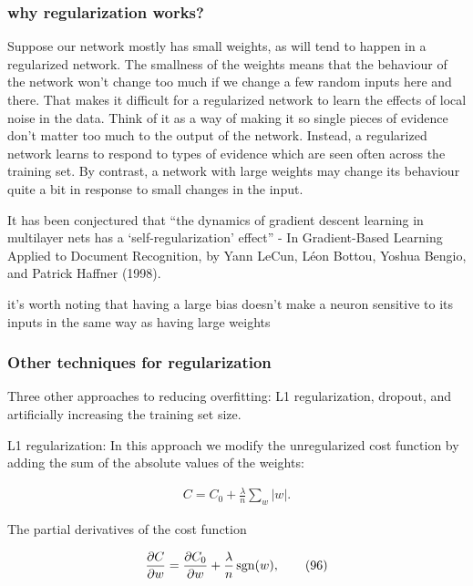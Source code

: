 \documentclass[]{book}
\begin{document}
\subsubsection{why regularization
works?}\label{why-regularization-works}

Suppose our network mostly has small weights, as will tend to happen in
a regularized network. The smallness of the weights means that the
behaviour of the network won't change too much if we change a few random
inputs here and there. That makes it difficult for a regularized network
to learn the effects of local noise in the data. Think of it as a way of
making it so single pieces of evidence don't matter too much to the
output of the network. Instead, a regularized network learns to respond
to types of evidence which are seen often across the training set. By
contrast, a network with large weights may change its behaviour quite a
bit in response to small changes in the input.

It has been conjectured that ``the dynamics of gradient descent learning
in multilayer nets has a `self-regularization' effect'' - In
Gradient-Based Learning Applied to Document Recognition, by Yann LeCun,
Léon Bottou, Yoshua Bengio, and Patrick Haffner (1998).

it's worth noting that having a large bias doesn't make a neuron
sensitive to its inputs in the same way as having large weights

\subsubsection{Other techniques for
regularization}\label{other-techniques-for-regularization}

Three other approaches to reducing overfitting: L1 regularization,
dropout, and artificially increasing the training set size.

L1 regularization: In this approach we modify the unregularized cost
function by adding the sum of the absolute values of the weights:

\begin{eqnarray}
C = C_0 + \frac{\lambda}{n} \sum_w |w|.
\tag{95}\end{eqnarray}

The partial derivatives of the cost function

\begin{eqnarray}  
\frac{\partial C}{\partial w} = \frac{\partial C_0}{\partial w} + \frac{\lambda}{n} \, {\rm sgn}(w),
\tag{96}\end{eqnarray}
\end{document}

